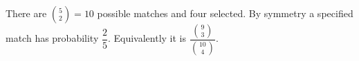 There are $\binom52=10$ possible matches and four selected. By symmetry a specified match has probability $\boxed{\dfrac{2}{5}}$. Equivalently it is $\dfrac{\binom93}{\binom{10}4}$.
